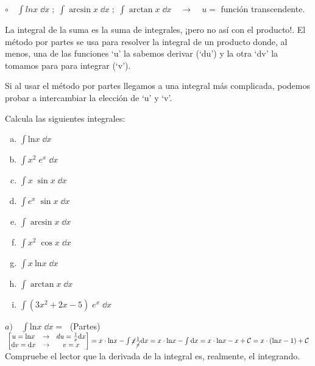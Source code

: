 $\circ \quad \displaystyle \int \mathrm {}ln x \; \dd x \; ; \; \displaystyle \int \arcsin x \; \dd x \; ; \; \displaystyle \int \arctan x \; \dd x \quad \to \quad u=$ función transcendente.

La integral de la suma es la suma de integrales, ¡pero no así con el producto!. El método por partes se usa para resolver la integral de un producto donde, al menos, una de las funciones `u' la sabemos derivar (`du') y la otra `dv' la tomamos para para integrar (`v').

Si al usar el método por partes llegamos a una integral más complicada, podemos probar a intercambiar la elección de `u' y `v'.

\begin{ejem}
	Calcula las siguientes integrales:
	\begin{multicols}{2}
	\begin{enumerate}[a) ]
		\item $\displaystyle \int \mathrm{ln} x \; \dd x$
		\item $\displaystyle \int x^2\; e^x\; \dd x$
		\item $\displaystyle \int x\; \sin x\; \dd x$
		\item $\displaystyle \int e^x\; \sin x\; \dd x$
		\item $\displaystyle \int \arcsin x \; \dd x$
		\item $\displaystyle \int x^2 \; \cos x \; \dd x$
		\item $\displaystyle \int x \: \mathrm{ln}x \; \dd x$
		\item $\displaystyle \int \arctan x \; \dd x$
		\item $\displaystyle \int (3x^2+2x-5)\; e^x\; \dd x$
	\end{enumerate}	
	\end{multicols}
	\vspace{3mm}
	$a) \quad \displaystyle \int \mathrm{ln} x \; \dd x = \; $ (Partes) $ \; \left[ \begin{matrix} u=\mathrm{ln}x & \to & du=\frac 1 x \dd x \\ \dd v= \dd x & \to & v=x \end{matrix} \right] = x\cdot \mathrm{ln}x - \int \cancel{x} \frac {1} {\cancel{x}} \dd x =x\cdot \mathrm{ln}x - \int \dd x= x\cdot \mathrm{ln}x -x +\mathcal C = x\cdot (\mathrm{ln}x -1)+\mathcal C\; $ \textcolor{gris}{Compruebe el lector que la derivada de la integral es, realmente, el integrando.}
	

\end{ejem}
